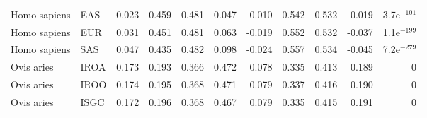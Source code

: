 \begin{longtable}{llrrrrrrrrr}
        Homo sapiens &                       EAS &                              0.023 &                               0.459 &                 0.481 &                 0.047 &                             -0.010 &                               0.542 &                 0.532 &                -0.019 & 3.7e$^{-101}$ \\
        Homo sapiens &                       EUR &                              0.031 &                               0.451 &                 0.481 &                 0.063 &                             -0.019 &                               0.552 &                 0.532 &                -0.037 & 1.1e$^{-199}$ \\
        Homo sapiens &                       SAS &                              0.047 &                               0.435 &                 0.482 &                 0.098 &                             -0.024 &                               0.557 &                 0.534 &                -0.045 & 7.2e$^{-279}$ \\
          Ovis aries &                      IROA &                              0.173 &                               0.193 &                 0.366 &                 0.472 &                              0.078 &                               0.335 &                 0.413 &                 0.189 &             0 \\
          Ovis aries &                      IROO &                              0.174 &                               0.195 &                 0.368 &                 0.471 &                              0.079 &                               0.337 &                 0.416 &                 0.190 &             0 \\
          Ovis aries &                      ISGC &                              0.172 &                               0.196 &                 0.368 &                 0.467 &                              0.079 &                               0.335 &                 0.415 &                 0.191 &             0 \\
\end{longtable}
